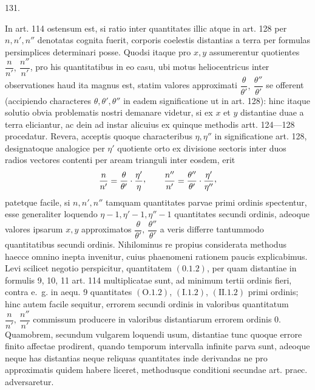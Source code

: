 \par{}\medskip
\begin{center}\hypertarget{native-178-article131}{}131.\end{center}
In art. 114 ostensum est, si ratio inter quantitates illic atque in art. 128
per $n,n',n''$ denotatas cognita fuerit, corporis coelestis distantias a terra per
formulas persimplices determinari posse. Quodsi itaque pro $x,y$ assumerentur
quotientes $\dfrac{n}{n'},\ \dfrac{n''}{n'}$, pro his quantitatibus in eo casu, ubi motus heliocentricus
inter observationes haud ita magnus est, statim valores approximati $\dfrac{\theta}{\theta'},\ \dfrac{\theta''}{\theta'}$
se offerent (accipiendo characteres $\theta,\theta',\theta''$ in eadem significatione ut in art. 128):
hinc itaque solutio obvia problematis nostri demanare videtur, si ex $x$ et $y$
distantiae duae a terra eliciantur, ac dein ad instar alicuius ex quinque methodis
artt. 124—128 procedatur. Revera, acceptis quoque characteribus $\eta,\eta''$
in significatione art. 128, designatoque analogice per $\eta'$ quotiente orto ex divisione
sectoris inter duos radios vectores contenti per aream trianguli inter
eosdem, erit
\[
\frac{n}{n'}=\frac{\theta}{\theta'}\cdot\frac{\eta'}{\eta}\mathpunct{\raisebox{.45ex}{,}}\qquad
\frac{n''}{n'}=\frac{\theta''}{\theta'}\cdot\frac{\eta'}{\eta''}\mathpunct{\raisebox{.45ex}{,}}
\]
patetque facile, si $n,n',n''$ tamquam quantitates parvae primi ordinis spectentur,
esse generaliter loquendo $\eta-1,\eta'-1,\eta''-1$ quantitates secundi ordinis,
adeoque valores ipsarum $x,y$ approximatos $\dfrac{\theta}{\theta'},\ \dfrac{\theta''}{\theta'}$ a veris differre tantummodo
quantitatibus secundi ordinis. Nihilominus re propius considerata methodus
haecce omnino inepta invenitur, cuius phaenomeni rationem paucis explicabimus.
Levi scilicet negotio perspicitur, quantitatem $(0.1.2)$, per quam
distantiae in formulis 9, 10, 11 art. 114 multiplicatae sunt, ad minimum tertii
ordinis fieri, contra e.\ g. in aequ. 9 quantitates $(\mathrm{O}.1.2)$, $(\mathrm{I}.1.2)$, $(\mathrm{II}.1.2)$ primi
ordinis; hinc autem facile sequitur, errorem secundi ordinis in valoribus quantitatum
$\dfrac{n}{n'},\ \dfrac{n''}{n'}$ commissum producere in valoribus distantiarum errorem ordinis
$0$. Quamobrem, secundum vulgarem loquendi usum, distantiae tunc quoque
errore finito affectae prodirent, quando temporum intervalla infinite parva
sunt, adeoque neque has distantias neque reliquas quantitates inde derivandas
ne pro approximatis quidem habere liceret, methodusque conditioni secundae
art. praec. adversaretur.

